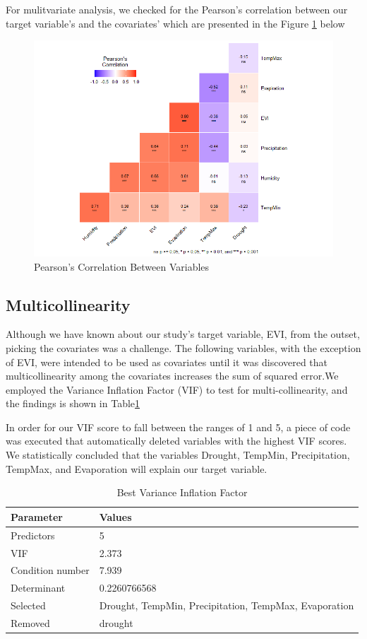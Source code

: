 For mulitvariate analysis, we checked for the Pearson’s correlation between our target variable’s and the covariates’ which are presented in the Figure \ref{fig:Correlation} below
\begin{figure}
	\centering
	\includegraphics[width=0.9\linewidth]{images/Correlation}
	\caption{Pearson’s Correlation Between Variables}
	\label{fig:Correlation}
\end{figure}

\subsection{Multicollinearity}
Although we have known about our study's target variable, EVI, from the outset, picking the covariates was a challenge. The following variables, with the exception of EVI, were intended to be used as covariates until it was discovered that multicollinearity among the covariates increases the sum of squared error.We employed the Variance Inﬂation Factor (VIF) to test for multi-collinearity, and the ﬁndings is shown in Table\ref{table:VIF}

In order for our VIF score to fall between the ranges of 1 and 5, a piece of code was executed that automatically deleted variables with the highest VIF scores. We statistically concluded that the variables Drought, TempMin, Precipitation, TempMax, and Evaporation will explain our target variable.
\begin{center}
	\begin{table}
	\label{table:VIF}
	\caption{Best Variance Inflation Factor}
	\centering
	\begin{tabular}{|l|l|}
		\hline\hline
		Parameter	& Values \\
		\hline\hline
		Predictors	& 5 \\
		VIF	& 2.373 \\
		Condition number 	& 7.939\\
		Determinant 	& 0.2260766568 \\
		Selected 	& Drought, TempMin, Precipitation, TempMax, Evaporation \\
		Removed 	&  drought\\
		\hline
	\end{tabular}
  \end{table}
\end{center}

